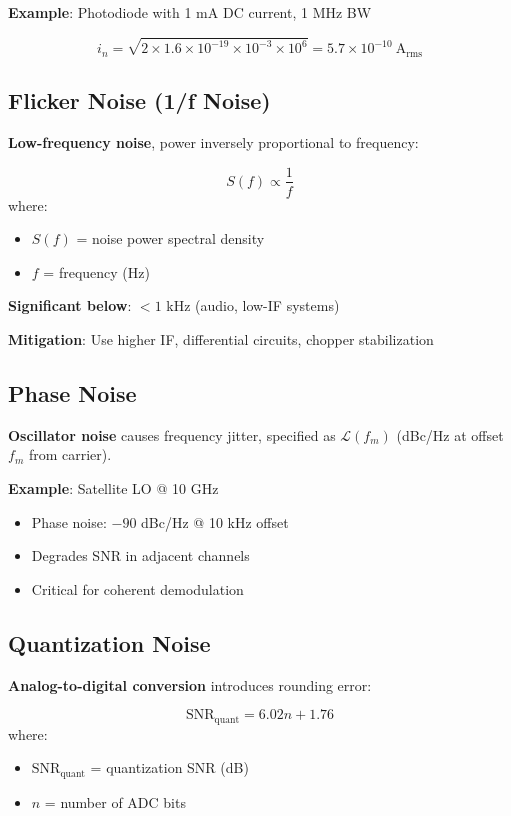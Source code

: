\textbf{Example}: Photodiode with 1 mA DC current, 1 MHz BW

\begin{equation}
i_n = \sqrt{2 \times 1.6 \times 10^{-19} \times 10^{-3} \times 10^6} = 5.7 \times 10^{-10}~\text{A}_{\text{rms}}
\end{equation}

\subsection{Flicker Noise (1/f Noise)}

\textbf{Low-frequency noise}, power inversely proportional to frequency:

\begin{equation}
S(f) \propto \frac{1}{f}
\end{equation}
where:
\begin{itemize}
\item $S(f)$ = noise power spectral density
\item $f$ = frequency (Hz)
\end{itemize}

\textbf{Significant below}: $< 1$ kHz (audio, low-IF systems)

\textbf{Mitigation}: Use higher IF, differential circuits, chopper stabilization

\subsection{Phase Noise}

\textbf{Oscillator noise} causes frequency jitter, specified as $\mathcal{L}(f_m)$ (dBc/Hz at offset $f_m$ from carrier).

\textbf{Example}: Satellite LO @ 10 GHz
\begin{itemize}
\item Phase noise: $-90$ dBc/Hz @ 10 kHz offset
\item Degrades SNR in adjacent channels
\item Critical for coherent demodulation
\end{itemize}

\subsection{Quantization Noise}

\textbf{Analog-to-digital conversion} introduces rounding error:

\begin{equation}
\text{SNR}_{\text{quant}} = 6.02n + 1.76
\end{equation}
where:
\begin{itemize}
\item $\text{SNR}_{\text{quant}}$ = quantization SNR (dB)
\item $n$ = number of ADC bits
\end{itemize}

